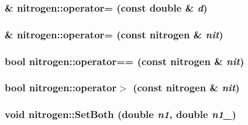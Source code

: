 \label{classnitrogen_a4e8a3471eb396100d47188f7d137d361}
\hypertarget{classnitrogen_a21c90f538da04099713adf9aac682d7f}{
\subsubsection[{operator=}]{ \& nitrogen::operator= (const double \& {\em d})}}
\label{classnitrogen_a21c90f538da04099713adf9aac682d7f}
\hypertarget{classnitrogen_a201ffc25ddffd11165eec93a377f85a5}{
\subsubsection[{operator=}]{ \& nitrogen::operator= (const {\bf nitrogen} \& {\em nit})}}
\label{classnitrogen_a201ffc25ddffd11165eec93a377f85a5}
\hypertarget{classnitrogen_ac9718e9f0f844022bf177b63f73d9205}{
\subsubsection[{operator==}]{\setlength{\rightskip}{0pt plus 5cm}bool nitrogen::operator== (const {\bf nitrogen} \& {\em nit})}}
\label{classnitrogen_ac9718e9f0f844022bf177b63f73d9205}
\hypertarget{classnitrogen_a84fad71c0de01978912fda244f32672f}{
\subsubsection[{operator$>$}]{\setlength{\rightskip}{0pt plus 5cm}bool nitrogen::operator$>$ (const {\bf nitrogen} \& {\em nit})}}
\label{classnitrogen_a84fad71c0de01978912fda244f32672f}
\hypertarget{classnitrogen_a49bebcba4c40f3c0a6abb24f590b2c8c}{
\subsubsection[{SetBoth}]{\setlength{\rightskip}{0pt plus 5cm}void nitrogen::SetBoth (double {\em n1}, \/  double {\em n1\_})}}
\label{classnitrogen_a49bebcba4c40f3c0a6abb24f590b2c8c}


